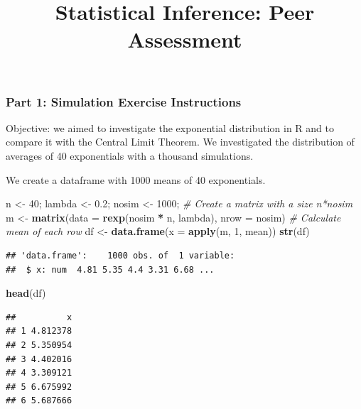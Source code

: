 \documentclass[
  landscape]{article}
\title{Statistical Inference: Peer Assessment}
\author{}
\date{\vspace{-2.5em}}
\newenvironment{Shaded}{\begin{snugshade}}{\end{snugshade}}
\newcommand{\CommentTok}[1]{\textcolor[rgb]{0.56,0.35,0.01}{\textit{#1}}}
\newcommand{\DataTypeTok}[1]{\textcolor[rgb]{0.13,0.29,0.53}{#1}}
\newcommand{\DecValTok}[1]{\textcolor[rgb]{0.00,0.00,0.81}{#1}}
\newcommand{\FloatTok}[1]{\textcolor[rgb]{0.00,0.00,0.81}{#1}}
\newcommand{\KeywordTok}[1]{\textcolor[rgb]{0.13,0.29,0.53}{\textbf{#1}}}
\newcommand{\NormalTok}[1]{#1}
\newcommand{\OperatorTok}[1]{\textcolor[rgb]{0.81,0.36,0.00}{\textbf{#1}}}
\newcommand{\StringTok}[1]{\textcolor[rgb]{0.31,0.60,0.02}{#1}}
\begin{document}
\maketitle

\hypertarget{part-1-simulation-exercise-instructions}{%
\subsubsection{Part 1: Simulation Exercise
Instructions}\label{part-1-simulation-exercise-instructions}}

Objective: we aimed to investigate the exponential distribution in R and
to compare it with the Central Limit Theorem. We investigated the
distribution of averages of 40 exponentials with a thousand simulations.

We create a dataframe with 1000 means of 40 exponentials.

\begin{Shaded}
\begin{Highlighting}[]
\NormalTok{n <-}\StringTok{ }\DecValTok{40}\NormalTok{; lambda <-}\StringTok{ }\FloatTok{0.2}\NormalTok{; nosim <-}\StringTok{ }\DecValTok{1000}\NormalTok{;}
\CommentTok{# Create a matrix with a size n*nosim  }
\NormalTok{m <-}\StringTok{ }\KeywordTok{matrix}\NormalTok{(}\DataTypeTok{data =} \KeywordTok{rexp}\NormalTok{(nosim }\OperatorTok{*}\StringTok{ }\NormalTok{n, lambda), }\DataTypeTok{nrow =}\NormalTok{ nosim)}
\CommentTok{# Calculate mean of each row}
\NormalTok{df <-}\StringTok{ }\KeywordTok{data.frame}\NormalTok{(}\DataTypeTok{x =} \KeywordTok{apply}\NormalTok{(m, }\DecValTok{1}\NormalTok{, mean))}
\KeywordTok{str}\NormalTok{(df)}
\end{Highlighting}
\end{Shaded}

\begin{verbatim}
## 'data.frame':    1000 obs. of  1 variable:
##  $ x: num  4.81 5.35 4.4 3.31 6.68 ...
\end{verbatim}

\begin{Shaded}
\begin{Highlighting}[]
\KeywordTok{head}\NormalTok{(df)}
\end{Highlighting}
\end{Shaded}

\begin{verbatim}
##          x
## 1 4.812378
## 2 5.350954
## 3 4.402016
## 4 3.309121
## 5 6.675992
## 6 5.687666
\end{verbatim}
\end{document}
